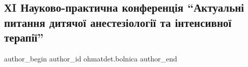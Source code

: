  
 
 
 
 
 
\subsection{ХI Науково-практична конференція \enquote{Актуальні питання дитячої анестезіології та інтенсивної терапії}}
\label{sec:06_12_2022.fb.ohmatdet.bolnica.2.konferencia}
 
\ifcmt
 author_begin
   author_id ohmatdet.bolnica
 author_end
\fi
